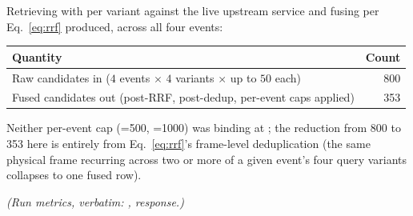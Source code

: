 Retrieving with  per variant against the live upstream
service and fusing per Eq.~\ref{eq:rrf} produced, across all four events:

\begin{center}
\begin{tabular}{@{}lr@{}}
\toprule
Quantity & Count \\
\midrule
Raw candidates in ($4$ events $\times$ $4$ variants $\times$ up to $50$ each) & 800 \\
Fused candidates out (post-RRF, post-dedup, per-event caps applied) & 353 \\
\bottomrule
\end{tabular}
\end{center}

\noindent Neither per-event cap (=500,
=1000) was binding at ; the reduction
from 800 to 353 here is entirely from Eq.~\ref{eq:rrf}'s
frame-level deduplication (the same physical frame recurring across two or
more of a given event's four query variants collapses to one fused row).

\emph{(Run metrics, verbatim: ,  response.)}

